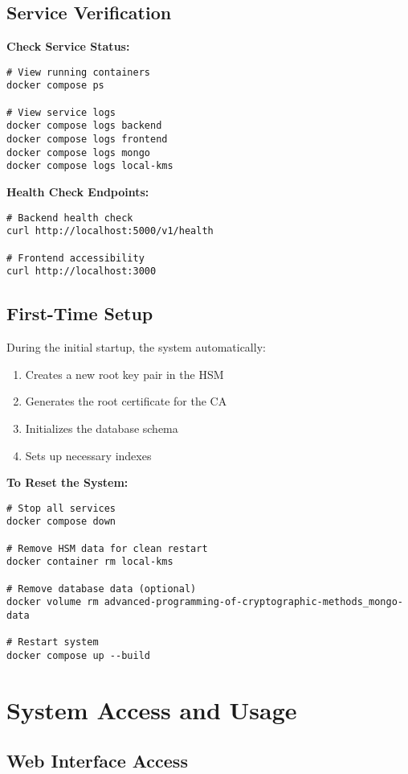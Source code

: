 \subsection{Service Verification}

\textbf{Check Service Status:}
\begin{verbatim}
# View running containers
docker compose ps

# View service logs
docker compose logs backend
docker compose logs frontend
docker compose logs mongo
docker compose logs local-kms
\end{verbatim}

\textbf{Health Check Endpoints:}
\begin{verbatim}
# Backend health check
curl http://localhost:5000/v1/health

# Frontend accessibility
curl http://localhost:3000
\end{verbatim}

\subsection{First-Time Setup}

During the initial startup, the system automatically:
\begin{enumerate}
    \item Creates a new root key pair in the HSM
    \item Generates the root certificate for the CA
    \item Initializes the database schema
    \item Sets up necessary indexes
\end{enumerate}

\textbf{To Reset the System:}
\begin{verbatim}
# Stop all services
docker compose down

# Remove HSM data for clean restart
docker container rm local-kms

# Remove database data (optional)
docker volume rm advanced-programming-of-cryptographic-methods_mongo-data

# Restart system
docker compose up --build
\end{verbatim}

\section{System Access and Usage}

\subsection{Web Interface Access}

